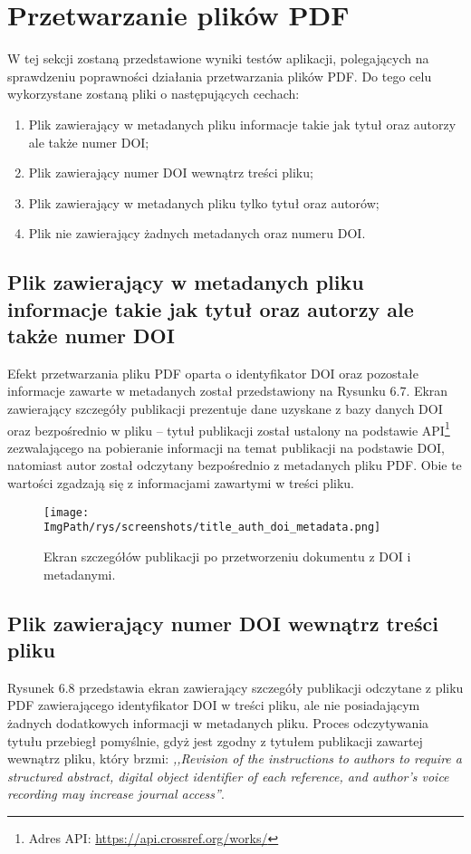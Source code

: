 \documentclass[a4paper,12pt,twoside,openany]{report}
\newcommand{\ImgPath}{.}
\begin{document}
\section{Przetwarzanie plików PDF}
W tej sekcji zostaną przedstawione wyniki testów aplikacji, polegających na sprawdzeniu poprawności działania przetwarzania plików PDF. Do tego celu wykorzystane zostaną pliki o następujących cechach:
\begin{enumerate}
	\item Plik zawierający w metadanych pliku informacje takie jak tytuł oraz autorzy ale także numer DOI;
	\item Plik zawierający numer DOI wewnątrz treści pliku;
	\item Plik zawierający w metadanych pliku tylko tytuł oraz autorów;
	\item Plik nie zawierający żadnych metadanych oraz numeru DOI.
\end{enumerate}

\subsection{Plik zawierający w metadanych pliku informacje takie jak tytuł oraz autorzy ale także numer DOI}
Efekt przetwarzania pliku PDF oparta o identyfikator DOI oraz pozostałe informacje zawarte w metadanych został przedstawiony na Rysunku 6.7. Ekran zawierający szczegóły publikacji prezentuje dane uzyskane z bazy danych DOI oraz bezpośrednio w pliku -- tytuł publikacji został ustalony na podstawie API\footnote{Adres API: \url{https://api.crossref.org/works/}} zezwalającego na pobieranie informacji na temat publikacji na podstawie DOI, natomiast autor został odczytany bezpośrednio z metadanych pliku PDF. Obie te wartości zgadzają się z informacjami zawartymi w treści pliku.

\begin{figure}[!htbp]
	\begin{center}
		\centering
		\texttt{[image: \\ImgPath/rys/screenshots/title\_auth\_doi\_metadata.png]}
	\end{center}
	\caption{Ekran szczegółów publikacji po przetworzeniu dokumentu z DOI i metadanymi.}
	\label{zrzutPrzetwarzanieFull}
\end{figure}

\pagebreak

\subsection{Plik zawierający numer DOI wewnątrz treści pliku}
Rysunek 6.8  przedstawia ekran zawierający szczegóły publikacji odczytane z pliku PDF zawierającego identyfikator DOI w treści pliku, ale nie posiadającym żadnych dodatkowych informacji w metadanych pliku. Proces odczytywania tytułu przebiegł pomyślnie, gdyż jest zgodny z tytułem publikacji zawartej wewnątrz pliku, który brzmi: \textit{,,Revision of the instructions to authors to require a structured
abstract, digital object identifier of each reference, and author’s
voice recording may increase journal access''}.
\end{document}
